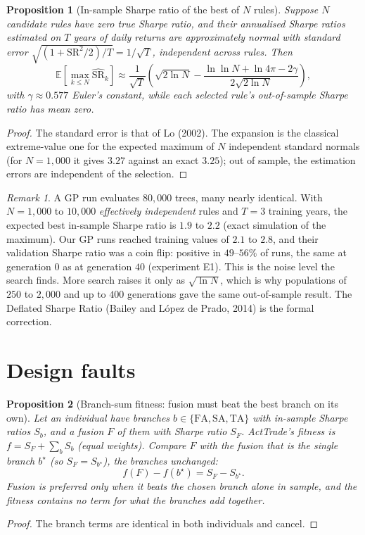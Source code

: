 \documentclass[11pt,a4paper]{article}
\newtheorem{proposition}{Proposition}
\theoremstyle{remark}
\newtheorem*{remark}{Remark}
\newcommand{\E}{\mathbb{E}}
\newcommand{\SR}{\mathrm{SR}}
\begin{document}
\begin{proposition}[In-sample Sharpe ratio of the best of $N$ rules]\label{prop:max}
Suppose $N$ candidate rules have zero true Sharpe ratio, and their annualised Sharpe ratios estimated on $T$ years of daily returns are approximately normal with standard error $\sqrt{(1+\SR^2/2)/T}=1/\sqrt{T}$, independent across rules. Then
\begin{equation}
\E\!\left[\max_{k\le N}\widehat{\SR}_k\right] \approx \frac{1}{\sqrt{T}}\left(\sqrt{2\ln N} - \frac{\ln\ln N+\ln 4\pi - 2\gamma}{2\sqrt{2\ln N}}\right),
\end{equation}
with $\gamma\approx0.577$ Euler's constant, while each selected rule's out-of-sample Sharpe ratio has mean zero.
\end{proposition}
\begin{proof}
The standard error is that of Lo (2002). The expansion is the classical extreme-value one for the expected maximum of $N$ independent standard normals (for $N=1{,}000$ it gives $3.27$ against an exact $3.25$); out of sample, the estimation errors are independent of the selection.
\end{proof}

\begin{remark}
A GP run evaluates $80{,}000$ trees, many nearly identical. With $N=1{,}000$ to $10{,}000$ \emph{effectively independent} rules and $T=3$ training years, the expected best in-sample Sharpe ratio is $1.9$ to $2.2$ (exact simulation of the maximum). Our GP runs reached training values of $2.1$ to $2.8$, and their validation Sharpe ratio was a coin flip: positive in $49$--$56\%$ of runs, the same at generation $0$ as at generation $40$ (experiment E1). This is the noise level the search finds. More search raises it only as $\sqrt{\ln N}$, which is why populations of $250$ to $2{,}000$ and up to $400$ generations gave the same out-of-sample result. The Deflated Sharpe Ratio (Bailey and L\'opez de Prado, 2014) is the formal correction.
\end{remark}

\section{Design faults}

\begin{proposition}[Branch-sum fitness: fusion must beat the best branch on its own]\label{prop:fusion}
Let an individual have branches $b\in\{\mathrm{FA},\mathrm{SA},\mathrm{TA}\}$ with in-sample Sharpe ratios $S_b$, and a fusion $F$ of them with Sharpe ratio $S_F$. ActTrade's fitness is $f = S_F + \sum_b S_b$ (equal weights). Compare $F$ with the fusion that is the single branch $b^\star$ (so $S_F=S_{b^\star}$), the branches unchanged:
\begin{equation}
f(F) - f(b^\star) = S_F - S_{b^\star}.
\end{equation}
Fusion is preferred only when it beats the chosen branch alone in sample, and the fitness contains no term for what the branches add together.
\end{proposition}
\begin{proof}
The branch terms are identical in both individuals and cancel.
\end{proof}
\end{document}

